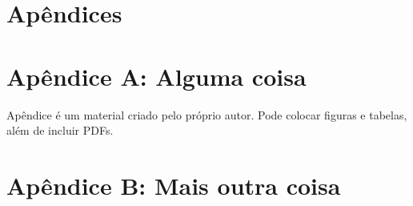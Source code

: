 \centering
\onecolumn
\section*{Apêndices}

\section*{Apêndice A: Alguma coisa}
\label{secao:ApendiceA}

Apêndice é um material criado pelo próprio autor.
Pode colocar figuras e tabelas, além de incluir PDFs.

\break

\section*{Apêndice B: Mais outra coisa}
\label{secao:ApendiceB}

